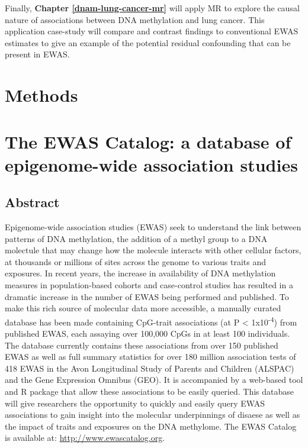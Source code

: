 \documentclass[11pt,twoside]{bristolthesis}
\begin{document}
Finally, \textbf{Chapter \ref{dnam-lung-cancer-mr}} will apply MR to explore the causal nature of associations between DNA methylation and lung cancer. This application case-study will compare and contrast findings to conventional EWAS estimates to give an example of the potential residual confounding that can be present in EWAS.

\hypertarget{methods}{%
\chapter{Methods}\label{methods}}

\hypertarget{ewas-catalog}{%
\chapter{The EWAS Catalog: a database of epigenome-wide association studies}\label{ewas-catalog}}

\hypertarget{abstract}{%
\section{Abstract}\label{abstract}}

Epigenome-wide association studies (EWAS) seek to understand the link between patterns of DNA methylation, the addition of a methyl group to a DNA molectule that may change how the molecule interacts with other cellular factors, at thousands or millions of sites across the genome to various traits and exposures. In recent years, the increase in availability of DNA methylation measures in population-based cohorts and case-control studies has resulted in a dramatic increase in the number of EWAS being performed and published. To make this rich source of molecular data more accessible, a manually curated database has been made containing CpG-trait associations (at P \textless{} 1x10\textsuperscript{-4}) from published EWAS, each assaying over 100,000 CpGs in at least 100 individuals. The database currently contains these associations from over 150 published EWAS as well as full summary statistics for over 180 million association tests of 418 EWAS in the Avon Longitudinal Study of Parents and Children (ALSPAC) and the Gene Expression Omnibus (GEO). It is accompanied by a web-based tool and R package that allow these associations to be easily queried. This database will give researchers the opportunity to quickly and easily query EWAS associations to gain insight into the molecular underpinnings of disaese as well as the impact of traits and exposures on the DNA methylome. The EWAS Catalog is available at: \url{http://www.ewascatalog.org}.
\end{document}
